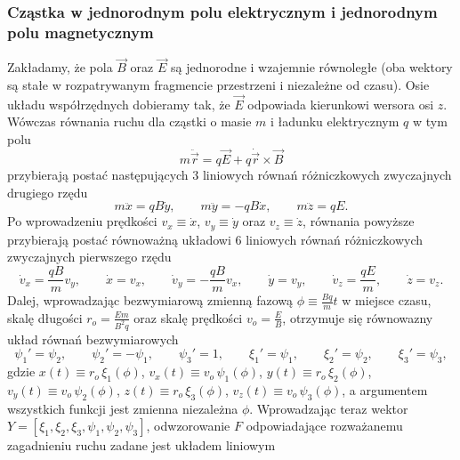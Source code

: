\subsubsection{Cząstka w jednorodnym polu elektrycznym i jednorodnym polu magnetycznym}
\indent Zakładamy, że pola $\vec{B}$ oraz $\vec{E}$ są jednorodne i wzajemnie równoległe (oba wektory są stałe w rozpatrywanym fragmencie przestrzeni i niezależne od czasu). Osie układu współrzędnych dobieramy tak, że $\vec{E}$ odpowiada kierunkowi wersora osi $z$. 
Wówczas równania ruchu dla cząstki o masie $m$ i ładunku elektrycznym $q$ w tym polu
$$m\ddot{\vec{r}}=q \vec{E}+q\dot{\vec{r}}\times\vec{B}$$ przybierają postać następujących $3$ liniowych równań różniczkowych zwyczajnych  drugiego rzędu
$$m\ddot{x}=q B \dot{y},\qquad
m\ddot{y}=-q B \dot{x}, \qquad
m\ddot{z}=q E.$$ %
Po wprowadzeniu prędkości $v_x\equiv\dot{x}$, $v_y\equiv\dot{y}$ oraz $v_z\equiv\dot{z}$, równania powyższe przybierają postać równoważną układowi $6$ liniowych równań różniczkowych zwyczajnych pierwszego rzędu
$$
\dot{v}_x=\frac{q B}{m} v_y,\qquad \dot{x}=v_x,\qquad
\dot{v}_y=-\frac{q B}{m} v_x,\qquad\dot{y}=v_y,\qquad
\dot{v}_z=\frac{q E}{m},\qquad\dot{z}=v_z.$$
Dalej, wprowadzając bezwymiarową zmienną fazową $\phi\equiv \frac{Bq}{m}t$ w miejsce czasu,  skalę długości $r_o=\frac{Em}{B^2q}$ oraz skalę prędkości $v_o=\frac{E}{B}$, otrzymuje się równowazny układ równań bezwymiarowych
$$\psi_1'=\psi_2,\qquad \psi_2'=-\psi_1,\qquad \psi_3'=1,\qquad \xi_1'=\psi_1,\qquad \xi_2'=\psi_2
,\qquad \xi_3'=\psi_3,$$ gdzie 
$x(t)\equiv r_o\,\xi_1(\phi)$, $v_x(t)\equiv v_o\,\psi_1(\phi)$,
$y(t)\equiv r_o\,\xi_2(\phi)$, $v_y(t)\equiv v_o\,\psi_2(\phi)$,
$z(t)\equiv r_o\,\xi_3(\phi)$, $v_z(t)\equiv v_o\,\psi_3(\phi)$, a argumentem wszystkich funkcji jest zmienna niezależna $\phi$. Wprowadzając teraz wektor $Y=[\xi_1,\xi_2,\xi_3,\psi_1,\psi_2,\psi_3]$, odwzorowanie $F$ odpowiadające rozważanemu zagadnieniu ruchu zadane jest układem liniowym 
